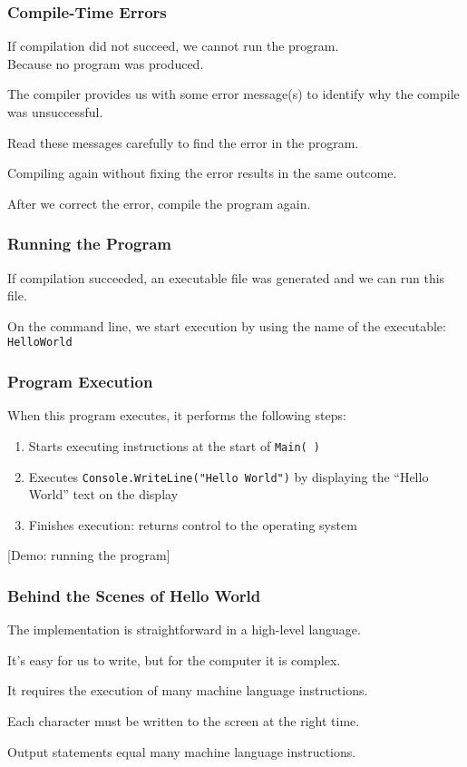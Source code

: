 \begin{frame}
\frametitle{Compile-Time Errors}

If compilation did not succeed, we cannot run the program.\\
\quad Because no program was produced.

The compiler provides us with some error message(s) to identify why the compile was unsuccessful.

Read these messages carefully to find the error in the program.

Compiling again without fixing the error results in the same outcome.

After we correct the error, compile the program again.

\end{frame}

\begin{frame}
\frametitle{Running the Program} 
If compilation succeeded, an executable file was generated and we can run this file.

On the command line, we start execution by using the name of the executable:\\
\quad\texttt{HelloWorld}

\end{frame}

\begin{frame}
\frametitle{Program Execution}

When this program executes, it performs the following steps:

\begin{enumerate}
	\item Starts executing instructions at the start of \texttt{Main( )}
	\item Executes \texttt{Console.WriteLine("Hello World")} by displaying the ``Hello World'' text on the display
	\item Finishes execution: returns control to the operating system
\end{enumerate}

[Demo: running the program]

\end{frame}

\begin{frame}
\frametitle{Behind the Scenes of Hello World}

The implementation is straightforward in a high-level language.

It's easy for us to write, but for the computer it is complex.

It requires the execution of many machine language instructions.

Each character must be written to the screen at the right time.

Output statements equal many machine language instructions.

\end{frame}


